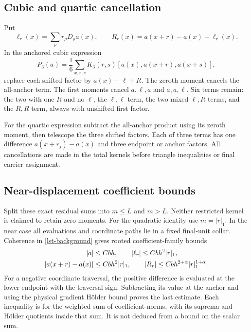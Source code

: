 \documentclass[11pt]{article}
\theoremstyle{remark}
\begin{document}
\subsection{Cubic and quartic cancellation}
\label{lst-higher-algebra}

Put
\begin{equation}
 \ell_r(x)=\sum_\rho r_\rho D_\rho a(x),\qquad
 R_r(x)=a(x+r)-a(x)-\ell_r(x).
 \label{lst-Taylor}
\end{equation}
In the anchored cubic expression
\[
 P_3(a)=\frac16\sum_{x,r,s}
                K_3(r,s)[a(x),a(x+r),a(x+s)],
\]
replace each shifted factor by \(a(x)+\ell+R\).
The zeroth moment cancels the all-anchor term. The
first moments cancel \(a,\ell,a\) and \(a,a,\ell\).
Six terms remain: the two with one \(R\) and no \(\ell\),
the \(\ell,\ell\) term, the two mixed \(\ell,R\) terms,
and the \(R,R\) term, always with unshifted first factor.

For the quartic expression subtract the all-anchor product
using its zeroth moment, then telescope the three shifted
factors. Each of three terms has one difference
\(a(x+r_j)-a(x)\) and three endpoint or anchor factors.
All cancellations are made in the total kernels before
triangle inequalities or final carrier assignment.

\subsection{Near-displacement coefficient bounds}
\label{lst-near-section}

Split these exact residual sums into \(m\le L\) and \(m>L\).
Neither restricted kernel is claimed to retain zero moments.
For the quadratic identity use \(m=|r|_1\).
In the near case all evaluations and coordinate paths lie
in a fixed final-unit collar. Coherence in
\eqref{lst-background} gives rooted coefficient-family bounds
\begin{align}
 |a|&\le Cbh,\qquad
 |\ell_r|\le Cbh^2|r|_1,\notag\\
 |a(x+r)-a(x)|&\le Cbh^2|r|_1,\qquad
 |R_r|\le Cbh^{2+\alpha}|r|_1^{1+\alpha}.
 \label{lst-near-fields}
\end{align}
For a negative coordinate traversal, the positive difference
is evaluated at the lower endpoint with the traversal sign.
Subtracting its value at the anchor and using the physical
gradient H\"older bound proves the last estimate.
Each inequality is for the weighted sum of coefficient
norms, with its suprema and H\"older quotients inside that
sum. It is not deduced from a bound on the scalar sum.
\end{document}
